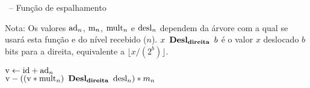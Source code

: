 \begin{algorithm}
	\caption{\Espalha\ -- Função de espalhamento}
	\label{alg:espalha}
	
	\BlankLine
	
	Nota: Os valores $\mathrm{ad}_{n}$, $\mathrm{m}_{n}$,
	                 $\mathrm{mult}_{n}$ e $\mathrm{desl}_{n}$
	      dependem da árvore com a qual se usará esta função
	      e do nível recebido ($n$).
	      $x \Desl b$ é o valor $x$ deslocado $b$ bits para a direita,
	      equivalente a $\lfloor x/(2^b)\rfloor$. \\
	\BlankLine
	
	$\mathrm{v} \gets \mathrm{id} + \mathrm{ad}_{n}$ \\
	\Retorna $\var{v} - ((\var{v} * \var{mult}_{n})
		\Desl \var{desl}_{n}) * m_{n}$ \\
\end{algorithm}
